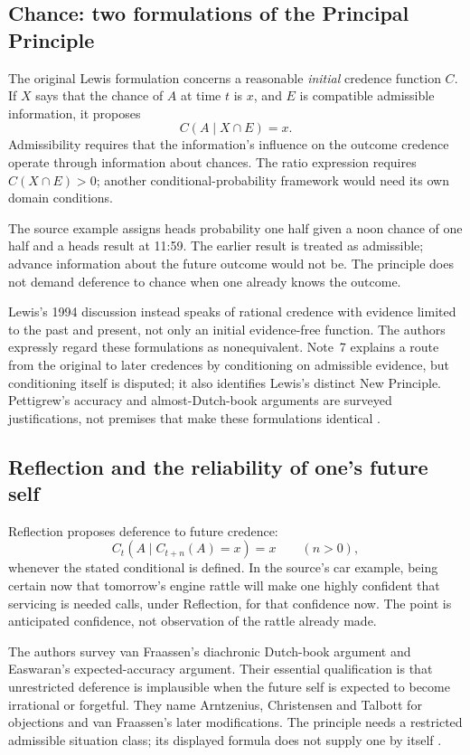\subsection{Chance: two formulations of the Principal Principle}

The original Lewis formulation concerns a reasonable \emph{initial}
credence function \(C\). If \(X\) says that the chance of \(A\) at
time \(t\) is \(x\), and \(E\) is compatible admissible information,
it proposes
\[
                         C(A\mid X\cap E)=x.
\]
Admissibility requires that the information's influence on the outcome
credence operate through information about chances. The ratio expression
requires \(C(X\cap E)>0\); another conditional-probability framework
would need its own domain conditions.

The source example assigns heads probability one half given a noon
chance of one half and a heads result at 11:59. The earlier result is
treated as admissible; advance information about the future outcome
would not be. The principle does not demand deference to chance when
one already knows the outcome.

Lewis's 1994 discussion instead speaks of rational credence with
evidence limited to the past and present, not only an initial
evidence-free function. The authors expressly regard these formulations
as nonequivalent. Note~7 explains a route from the original to later
credences by conditioning on admissible evidence, but conditioning
itself is disputed; it also identifies Lewis's distinct New Principle.
Pettigrew's accuracy and almost-Dutch-book arguments are surveyed
justifications, not premises that make these formulations identical
\parencite[p.~243 and p.~248, n.~7]{HajekStaffel2021Dynamics}.

\subsection{Reflection and the reliability of one's future self}

Reflection proposes deference to future credence:
\[
               C_t(A\mid C_{t+n}(A)=x)=x\qquad(n>0),
\]
whenever the stated conditional is defined. In the source's car example,
being certain now that tomorrow's engine rattle will make one highly
confident that servicing is needed calls, under Reflection, for that
confidence now. The point is anticipated confidence, not observation
of the rattle already made.

The authors survey van Fraassen's diachronic Dutch-book argument and
Easwaran's expected-accuracy argument. Their essential qualification is
that unrestricted deference is implausible when the future self is
expected to become irrational or forgetful. They name Arntzenius,
Christensen and Talbott for objections and van Fraassen's later
modifications. The principle needs a restricted admissible situation
class; its displayed formula does not supply one by itself
\parencite[p.~243]{HajekStaffel2021Dynamics}.

